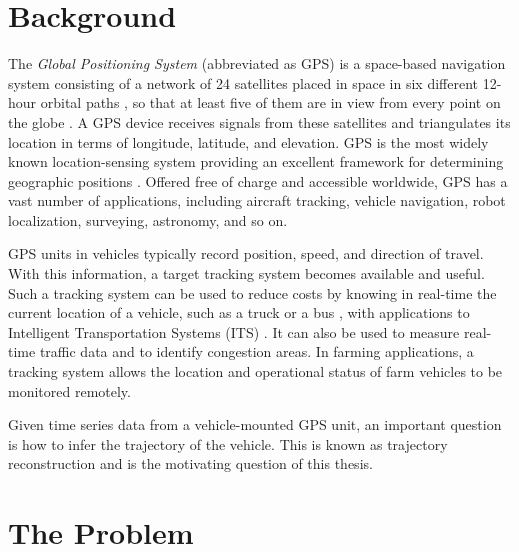

\section{Background}


The \textit{Global Positioning System} (abbreviated as GPS) is a space-based navigation system consisting of a network of 24 satellites placed in space in six different 12-hour orbital paths \citep{agrawal2015introduction}, so that at least five of them are in view from every point on the globe \citep{kaplan2005understanding, bajaj2002gps}. A GPS device receives signals from these satellites and triangulates its location in terms of longitude, latitude, and elevation. GPS is the most widely known location-sensing system providing an excellent framework for determining geographic positions \citep{hightower2001location}. Offered free of charge and accessible worldwide, GPS has a vast number of applications, including aircraft tracking, vehicle navigation, robot localization, surveying, astronomy, and so on. 

GPS units in vehicles typically record position, speed, and direction of travel. With this information, a target tracking system becomes available and useful. Such a tracking system can be used to reduce costs by knowing in real-time the current location of a vehicle, such as a truck or a bus \citep{chadil2008real}, with applications to  Intelligent Transportation Systems (ITS) \citep{mcdonald2006intelligent}. It can also be used to measure real-time traffic data and to identify congestion areas. In farming applications, a tracking system allows the location and operational status of farm vehicles to be monitored remotely. 




Given time series data from a vehicle-mounted GPS unit, an important question is how to infer the trajectory of the vehicle. This is known as trajectory reconstruction and is the motivating question of this thesis. 




\section{The Problem}

